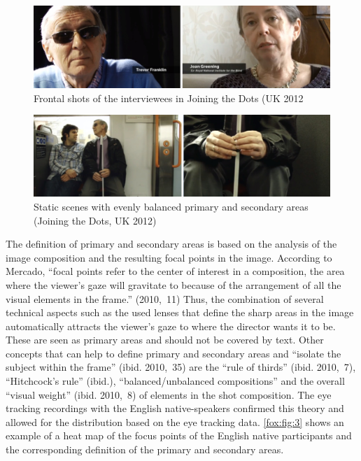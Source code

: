 \documentclass[output=paper]{langsci/langscibook}
\begin{document}
\begin{figure}
 \includegraphics[width=\textwidth]{figures/Fox1.png}
 \caption{Frontal shots of the interviewees in Joining the Dots (UK 2012}
  \label{fox:fig:1}
\end{figure}  

\begin{figure}
 \includegraphics[width=\textwidth]{figures/Fox2.png}
 \caption{Static scenes with evenly balanced primary and secondary areas (Joining the Dots, UK 2012)}
 \label{fox:fig:2}
\end{figure} 



The definition of primary and secondary areas is based on the analysis of the image composition and the resulting focal points in the image. According to Mercado, “focal points refer to the center of interest in a composition, the area where the viewer’s gaze will gravitate to because of the arrangement of all the visual elements in the frame.” (2010,~11) Thus, the combination of several technical aspects such as the used lenses that define the sharp areas in the image automatically attracts the viewer’s gaze to where the director wants it to be. These are seen as primary areas and should not be covered by text. Other concepts that can help to define primary and secondary areas and “isolate the subject within the frame” (ibid. 2010,~35) are the “rule of thirds” (ibid. 2010,~7), “Hitchcock’s rule” (ibid.), “balanced/unbalanced compositions” and the overall “visual weight” (ibid. 2010,~8) of elements in the shot composition. The eye tracking recordings with the English native-speakers confirmed this theory and allowed for the distribution based on the eye tracking data. \ref{fox:fig:3} shows an example of a heat map of the focus points of the English native participants and the corresponding definition of the primary and secondary areas.
\end{document}
